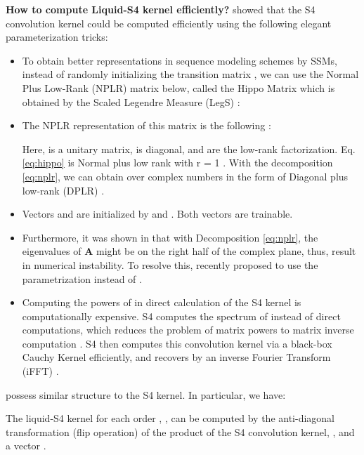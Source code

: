 \documentclass{MITcsail}
\begin{document}
\noindent \textbf{How to compute Liquid-S4 kernel efficiently?}
\citet{gu2022efficiently} showed that the S4 convolution kernel could be computed efficiently using the following elegant parameterization tricks:

\begin{itemize}
\item To obtain better representations in sequence modeling schemes by SSMs, instead of randomly initializing the transition matrix , we can use the Normal Plus Low-Rank (NPLR) matrix below, called the Hippo Matrix \citep{gu2020hippo} which is obtained by the Scaled Legendre Measure (LegS) \citep{gu2021combining,gu2022efficiently}:
\begingroup
\small

\endgroup
\item The NPLR representation of this matrix is the following \citep{gu2022efficiently}:

Here,  is a unitary matrix,  is diagonal, and  are the low-rank factorization. Eq. \ref{eq:hippo} is Normal plus low rank with r = 1 \citep{gu2022efficiently}. With the decomposition \ref{eq:nplr}, we can obtain  over complex numbers in the form of Diagonal plus low-rank (DPLR) \citep{gu2022efficiently}.
\item Vectors  and  are initialized by  and  \citep{gu2022parameterization}. Both vectors are trainable.
\item Furthermore, it was shown in \citet{gu2022parameterization} that with  Decomposition \ref{eq:nplr}, the eigenvalues of \textbf{A} might be on the right half of the complex plane, thus, result in numerical instability. To resolve this, \citet{gu2022parameterization} recently proposed to use the parametrization  instead of .
\item Computing the powers of  in direct calculation of the S4 kernel  is computationally expensive. S4 computes the spectrum of  instead of direct computations, which reduces the problem of matrix powers to matrix inverse computation \cite{gu2022efficiently}. S4 then computes this convolution kernel via a black-box Cauchy Kernel efficiently, and recovers  by an inverse Fourier Transform (iFFT) \citep{gu2022efficiently}. 
\end{itemize}

 possess similar structure to the S4 kernel. In particular, we have:

\begin{proposition}
\label{prop:liquid kernel}
The liquid-S4 kernel for each order , , can be computed by the anti-diagonal transformation (flip operation) of the product of the S4 convolution kernel, , and a vector .
\end{proposition}
\end{document}
